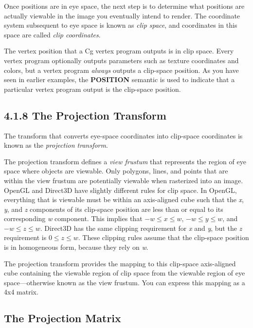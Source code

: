 \documentclass[../main.tex]{subfiles}
\begin{document}
Once positions are in eye space, the next step is to determine what positions are actually viewable in the image you eventually intend to render. The coordinate system subsequent to eye space is known as \textit{clip space}, and coordinates in this space are called \textit{clip coordinates}.

The vertex position that a Cg vertex program outputs is in clip space. Every vertex program optionally outputs parameters such as texture coordinates and colors, but a vertex program \textit{always} outputs a clip-space position. As you have seen in earlier examples, the \textbf{POSITION} semantic is used to indicate that a particular vertex program output is the clip-space position.

\subsection{4.1.8 The Projection Transform}

The transform that converts eye-space coordinates into clip-space coordinates is known as the \textit{projection transform}.

The projection transform defines a \textit{view frustum} that represents the region of eye space where objects are viewable. Only polygons, lines, and points that are within the view frustum are potentially viewable when rasterized into an image. OpenGL and Direct3D have slightly different rules for clip space. In OpenGL, everything that is viewable must be within an axis-aligned cube such that the \textit{x}, \textit{y}, and \textit{z} components of its clip-space position are less than or equal to its corresponding \textit{w} component. This implies that $-w \leq x \leq w$, $-w \leq y \leq w$, and $-w \leq z \leq w$. Direct3D has the same clipping requirement for \textit{x} and \textit{y}, but the \textit{z} requirement is $0 \leq z \leq w$. These clipping rules assume that the clip-space position is in homogeneous form, because they rely on \textit{w}.

The projection transform provides the mapping to this clip-space axis-aligned cube containing the viewable region of clip space from the viewable region of eye space—otherwise known as the view frustum. You can express this mapping as a 4x4 matrix.

\subsection*{The Projection Matrix}
\end{document}
